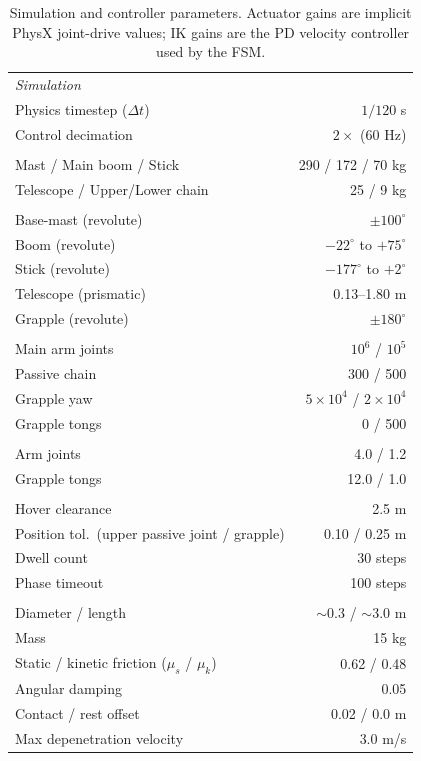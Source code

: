 \documentclass[conference]{IEEEtran}
\begin{document}
\begin{table}[t]
\centering
\caption{Simulation and controller parameters. Actuator gains are implicit PhysX joint-drive values; IK gains are the PD velocity controller used by the FSM.}
\label{tab:sim_params}
\setlength{\tabcolsep}{3pt}
\small
\begin{tabular}{@{}lr@{}}
\toprule
\multicolumn{2}{l}{\textit{Simulation}} \\[2pt]
Physics timestep ($\Delta t$) & $1/120$ s \\
Control decimation & $2\times$ (60 Hz) \\
\addlinespace[4pt]
\multicolumn{2}{l}{\textit{Crane link masses}} \\[2pt]
Mast / Main boom / Stick & 290 / 172 / 70 kg \\
Telescope / Upper/Lower chain & 25 / 9 kg \\
\addlinespace[4pt]
\multicolumn{2}{l}{\textit{Joint limits}} \\[2pt]
Base-mast (revolute) & $\pm100^{\circ}$ \\
Boom (revolute) & $-22^{\circ}$ to $+75^{\circ}$ \\
Stick (revolute) & $-177^{\circ}$ to $+2^{\circ}$ \\
Telescope (prismatic) & 0.13--1.80 m \\
Grapple (revolute) & $\pm180^{\circ}$ \\
\addlinespace[4pt]
\multicolumn{2}{l}{\textit{Actuator gains} ($k_p$ / $k_d$)} \\[2pt]
Main arm joints & $10^{6}$ / $10^{5}$ \\
Passive chain & 300 / 500 \\
Grapple yaw & $5\!\times\!10^{4}$ / $2\!\times\!10^{4}$ \\
Grapple tongs & 0 / 500 \\
\addlinespace[4pt]
\multicolumn{2}{l}{\textit{IK controller PD gains} ($k_p$ / $k_d$)} \\[2pt]
Arm joints & 4.0 / 1.2 \\
Grapple tongs & 12.0 / 1.0 \\
\addlinespace[4pt]
\multicolumn{2}{l}{\textit{FSM parameters}} \\[2pt]
Hover clearance & 2.5 m \\
Position tol.\ (upper passive joint / grapple) & 0.10 / 0.25 m \\
Dwell count & 30 steps \\
Phase timeout & 100 steps \\
\addlinespace[4pt]
\multicolumn{2}{l}{\textit{Log properties}} \\[2pt]
Diameter / length & $\sim$0.3 / $\sim$3.0 m \\
Mass & 15 kg \\
Static / kinetic friction ($\mu_s$ / $\mu_k$) & 0.62 / 0.48 \\
Angular damping & 0.05 \\
Contact / rest offset & 0.02 / 0.0 m \\
Max depenetration velocity & 3.0 m/s \\
\bottomrule
\end{tabular}
\end{table}
\end{document}
